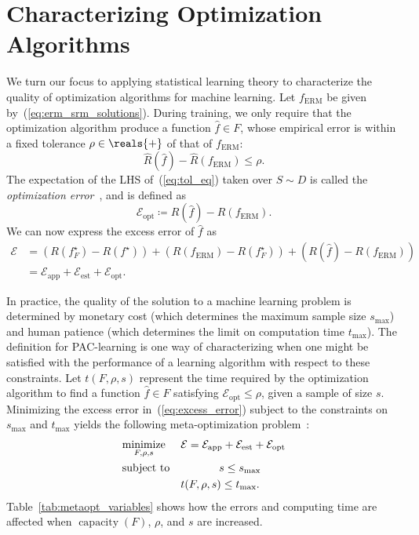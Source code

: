 \documentclass[11pt,a4paper]{article}
\numberwithin{equation}{section}
\newcommand{\capacity}{\operatorname{capacity}}
\newcommand{\apperr}{\mathcal{E}_{\mathrm{app}}}
\newcommand{\esterr}{\mathcal{E}_{\mathrm{est}}}
\newcommand{\opterr}{\mathcal{E}_{\mathrm{opt}}}
\begin{document}
\section{Characterizing Optimization Algorithms}

We turn our focus to applying statistical learning theory to characterize the
quality of optimization algorithms for machine learning. Let $f_{\text{ERM}}$ be
given by~(\ref{eq:erm_srm_solutions}). During training, we only require that the
optimization algorithm produce a function $\hat{f} \in F$, whose empirical error
is within a fixed tolerance $\rho \in \reals{+}$ of that of $f_{\text{ERM}}$:
\begin{equation}
	\hat{R}(\hat{f}) - \hat{R}(f_{\text{ERM}}) \leq \rho.
	\label{eq:tol_eq}
\end{equation}
The expectation of the LHS of~(\ref{eq:tol_eq}) taken over $S \sim D$ is called
the \emph{optimization error}~\citep{bousquet2008tradeoffs}, and is defined as
\[
	\opterr \coloneqq R(\hat{f}) - R(f_{\text{ERM}}).
\]
We can now express the excess error of $\hat{f}$ as
\begin{align}
	\mathcal{E}
	&= (R(f_F^\star) - R(f^\star)) + (R(f_{\text{ERM}}) - R(f_F^\star)) +
		(R(\hat{f}) - R(f_{\text{ERM}})) \\
	&= \apperr + \esterr + \opterr.
	\label{eq:excess_error}
\end{align}

In practice, the quality of the solution to a machine learning problem is
determined by monetary cost (which determines the maximum sample size
$s_{\text{max}}$) and human patience (which determines the limit on
computation time $t_{\text{max}}$). The definition for PAC-learning is one way
of characterizing when one might be satisfied with the performance of a learning
algorithm with respect to these constraints. Let $t(F, \rho, s)$ represent the
time required by the optimization algorithm to find a function $\hat{f} \in F$
satisfying $\opterr \leq \rho$, given a sample of size $s$. Minimizing the
excess error in~(\ref{eq:excess_error}) subject to the constraints on
$s_{\text{max}}$ and $t_{\text{max}}$ yields the following meta-optimization
problem~\citep{bousquet2008tradeoffs}:
\begin{equation}
\begin{aligned}
	& \underset{F, \rho, s}{\text{minimize}} & &
		\mathcal{E} = \apperr + \esterr + \opterr \\
	& \text{subject to} & & \hspace{3.5em} s \leq s_{\text{max}} \\
	& & & t(F, \rho, s) \leq t_{\text{max}}.
\end{aligned}
\label{eq:metaopt_program}
\end{equation}
Table~\ref{tab:metaopt_variables} shows how the errors and computing time are
affected when $\capacity(F)$, $\rho$, and $s$ are increased.
\end{document}
